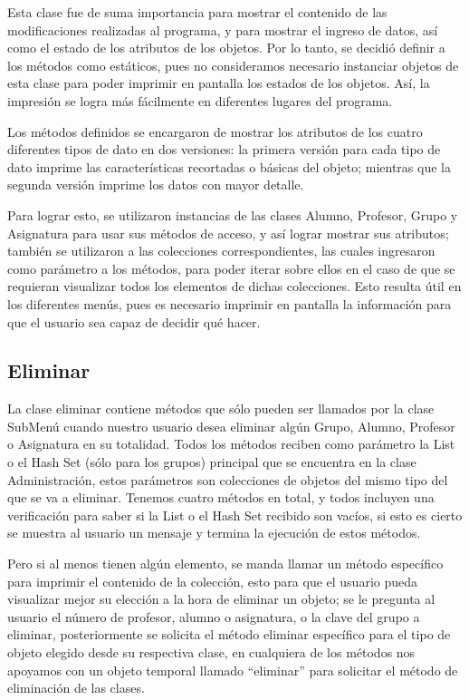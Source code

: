 \documentclass[11pt]{article}
\begin{document}
Esta clase fue de suma importancia para mostrar el contenido de las 
modificaciones realizadas al programa, y para mostrar el ingreso de 
datos, así como el estado de los atributos de los objetos. Por lo 
tanto, se decidió definir a los métodos como estáticos, pues no 
consideramos necesario instanciar objetos de esta clase para poder 
imprimir en pantalla los estados de los objetos. Así, la impresión se 
logra más fácilmente en diferentes lugares del programa. 

\par

Los métodos definidos se encargaron de mostrar los atributos de los 
cuatro diferentes tipos de dato en dos versiones: la primera versión 
para cada tipo de dato imprime las características recortadas o 
básicas del objeto; mientras que la segunda versión imprime los datos 
con mayor detalle. 
\par
Para lograr esto, se utilizaron instancias de las clases Alumno, 
Profesor, Grupo y Asignatura para usar sus métodos de acceso, y así 
lograr mostrar sus atributos; también se utilizaron a las colecciones 
correspondientes, las cuales ingresaron como parámetro a los métodos, 
para poder iterar sobre ellos en el caso de que se requieran 
visualizar todos los elementos de dichas colecciones. Esto resulta 
útil en los diferentes menús, pues es necesario imprimir en pantalla 
la información para que el usuario sea capaz de decidir qué hacer.

\subsection{Eliminar}
\par

La clase eliminar contiene métodos que sólo pueden ser llamados por la clase SubMenú cuando nuestro usuario desea eliminar algún Grupo, Alumno, Profesor o Asignatura en su totalidad. Todos los métodos reciben como parámetro la List o el Hash Set (sólo para los grupos) principal que se encuentra en la clase Administración, estos parámetros son colecciones de objetos del mismo tipo del que se va a eliminar. Tenemos cuatro métodos en total, y todos incluyen una verificación para saber si la List o el Hash Set recibido son vacíos, si esto es cierto se muestra al usuario un mensaje y termina la ejecución de estos métodos. 
\par
Pero si al menos tienen algún elemento, se manda llamar un método específico para imprimir el contenido de la colección, esto para que el usuario pueda visualizar mejor su elección a la hora de eliminar un objeto; se le pregunta al usuario el número de profesor, alumno o asignatura, o la clave del grupo a eliminar, posteriormente se solicita el método eliminar específico para el tipo de objeto elegido desde su respectiva clase, en cualquiera de los métodos nos apoyamos con un objeto temporal llamado “eliminar” para solicitar el método de eliminación de las clases.
\end{document}
